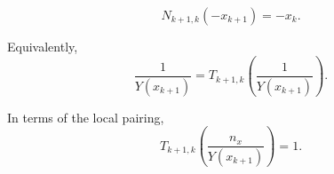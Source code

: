 $$N_{k+1,k}(-x_{k+1}) = -x_k.$$

Equivalently,
$$\frac{1}{Y(x_{k+1})} = T_{k+1,k}\left(\frac{1}{Y(x_{k+1})}\right).$$

In terms of the local pairing,
$$T_{k+1,k}\left(\frac{n_x}{Y(x_{k+1})}\right) = 1.$$
